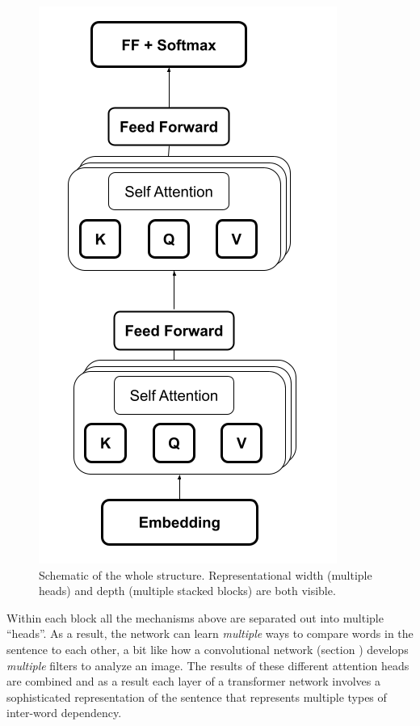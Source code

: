 \begin{figure}[h]
\centering
\includegraphics[scale=.6]{./images/transformerArchitectureSchematic.png}
\caption[Jeff Yoshimi with consultation from Tim Meyer.]{Schematic of the whole structure. Representational width (multiple heads) and depth (multiple stacked blocks) are both visible.  }
\label{transformerArchitectureSchematic}
\end{figure}



Within each block all the mechanisms above are separated out into multiple ``heads''. As a result, the network can learn \emph{multiple} ways to compare words in the sentence to each other, a bit like how a convolutional network (section ) develops \emph{multiple} filters to analyze an image.  The results of these different attention heads are combined and as a result each layer of a transformer network involves a sophisticated representation of the sentence that represents multiple types of inter-word dependency.

